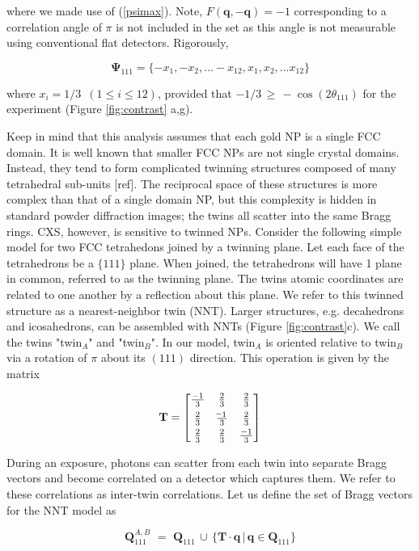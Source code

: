 \documentclass [11pt,fleqn]{article}
\newcommand*{\matminus}{%
  \leavevmode
  \hphantom{0}%
  \llap{%
    \settowidth{\dimen0 }{$0$}%
    \resizebox{1.1\dimen0 }{\height}{$-$}%
  }%
}
\def \be {\begin{equation}}
\def \ee {\end{equation}}
\begin{document}
where we made use of (\ref{psimax}). Note, $F(\bm q, -\bm q) = -1$ corresponding to a correlation angle of $\pi$ is not included in the set as this angle is not measurable using conventional flat detectors. Rigorously,

\be
\bm \Psi_{111} = \{ -x_1, -x_2, ... -x_{12}, x_1, x_2, ... x_{12} \}
\ee 

where $x_i = 1/3\,\,\, (1 \le i \le 12 )$, provided that $ -1/3 \, \ge \, - \cos (2\theta_{111}) $ for the experiment (Figure \ref{fig:contrast} a,g). 

Keep in mind that this analysis assumes that each gold NP is a single FCC domain. It is well known that smaller FCC NPs are not single crystal domains. Instead, they tend to form complicated twinning structures composed of many tetrahedral sub-units [ref]. The reciprocal space of these structures is more complex than that of a single domain NP, but this complexity is hidden in standard powder diffraction images; the twins all scatter into the same Bragg rings. CXS, however, is sensitive to twinned NPs. Consider the following simple model for two FCC tetrahedons joined by a twinning plane. Let each face of the tetrahedrons be a $\{111\}$ plane. When joined, the tetrahedrons will have 1 plane in common, referred to as the twinning plane. The twins atomic coordinates are related to one another by a reflection about this plane. We refer to this twinned structure as a nearest-neighbor twin (NNT). Larger structures, e.g. decahedrons and icosahedrons, can be assembled with NNTs (Figure \ref{fig:contrast}c). We call the twins "twin$_A$" and "twin$_B$".  In our model, twin$_A$ is oriented relative to twin$_B$ via a rotation of $\pi$ about its $(111)$ direction. This operation is given by the matrix

\be \label{twinmat}
\mathbf T = \begin{bmatrix}
       \frac{-1}{3} & \frac{2}{3} & \frac{2}{3}           \\[0.3em]
       \frac{2}{3} & \frac{\matminus 1}{3}           & \frac{2}{3} \\[0.3em]
       \frac{2}{3}           & \frac{2}{3} & \frac{-1}{3}
     \end{bmatrix}
\ee

During an exposure, photons can scatter from each twin into separate Bragg vectors and become correlated on a detector which captures them. We refer to these correlations as inter-twin correlations. Let us define the set of Bragg vectors for the NNT model as 

\be
\bm Q^{A,B}_{111}\,\, =\,\, \bm Q_{111} \, \cup \, \{  \mathbf T  \cdot \bm q \, \big |\, \bm q \in \bm Q_{111} \}
\ee
\end{document}
